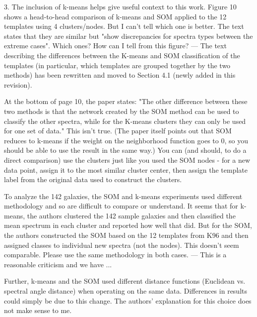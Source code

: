 3. The inclusion of k-means helps give useful context to this work. Figure 10 shows a head-to-head comparison of k-means and SOM applied to the 12 templates using 4 clusters/nodes.  But I can't tell which one is better.  The text states that they are similar but "show discrepancies for spectra types between the extreme cases".  Which ones?  How can I tell from this figure?
--- The text describing the differences between the K-means and SOM classification of the templates (in particular, which templates are grouped together by the two methods) has been rewritten and moved to Section 4.1 (newly added in this revision). 

At the bottom of page 10, the paper states: "The other difference between these two methods is that the network created by the SOM method can be used to classify the other spectra, while for the K-means clusters they can only be used for one set of data."  This isn't true.  (The paper itself points out that SOM reduces to k-means if the weight on the neighborhood function goes to 0, so you should be able to use the result in the same way.)  You can (and should, to do a direct comparison) use the clusters just like you used the SOM nodes - for a new data point, assign it to the most similar cluster center, then assign the template label from the original data used to construct the clusters.

To analyze the 142 galaxies, the SOM and k-means experiments used different methodology and so are difficult to compare or understand. It seems that for k-means, the authors clustered the 142 sample galaxies and then classified the mean spectrum in each cluster and reported how well that did.  But for the SOM, the authors constructed the SOM based on the 12 templates from K96 and then assigned classes to individual new spectra (not the nodes).  This doesn't seem comparable.  Please use the same methodology in both cases.
--- This is a reasonable criticism and we have ... 

Further, k-means and the SOM used different distance functions (Euclidean vs. spectral angle distance) when operating on the same data.  Differences in results could simply be due to this change.  The authors' explanation for this choice does not make sense to me.

